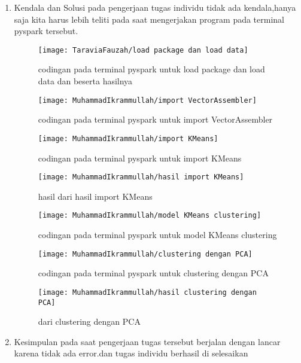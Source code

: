 \begin{enumerate}
\item Kendala dan Solusi
\newline pada pengerjaan tugas individu tidak ada kendala,hanya saja kita harus lebih teliti pada saat mengerjakan program pada terminal pyspark tersebut.

\begin{figure}[!ht]
\texttt{[image: TaraviaFauzah/load package dan load data]}
\caption{codingan pada terminal pyspark untuk load package dan load data dan beserta hasilnya }
\label{gam:perkuliahan2-15}
\end{figure}

\newpage
\begin{figure}[!ht]
\texttt{[image: MuhammadIkrammullah/import VectorAssembler]}
\caption{codingan pada terminal pyspark untuk import VectorAssembler }
\label{gam:perkuliahan2-15}
\end{figure}

\begin{figure}[!ht]
\texttt{[image: MuhammadIkrammullah/import KMeans]}
\caption{codingan pada terminal pyspark untuk import KMeans }
\label{gam:perkuliahan2-15}
\end{figure}

\begin{figure}[!ht]
\texttt{[image: MuhammadIkrammullah/hasil import KMeans]}
\caption{hasil dari hasil import KMeans }
\label{gam:perkuliahan2-15}
\end{figure}

\newpage
\begin{figure}[!ht]
\texttt{[image: MuhammadIkrammullah/model KMeans clustering]}
\caption{codingan pada terminal pyspark untuk model KMeans clustering}
\label{gam:perkuliahan2-15}
\end{figure}

\begin{figure}[!ht]
\texttt{[image: MuhammadIkrammullah/clustering dengan PCA]}
\caption{codingan pada terminal pyspark untuk clustering dengan PCA}
\label{gam:perkuliahan2-15}
\end{figure}

\begin{figure}[!ht]
\texttt{[image: MuhammadIkrammullah/hasil clustering dengan PCA]}
\caption{dari clustering dengan PCA}
\label{gam:perkuliahan2-15}
\end{figure}

\item Kesimpulan
\newline pada saat pengerjaan tugas tersebut berjalan dengan lancar karena tidak ada error.dan tugas individu berhasil di selesaikan

\end{enumerate}


